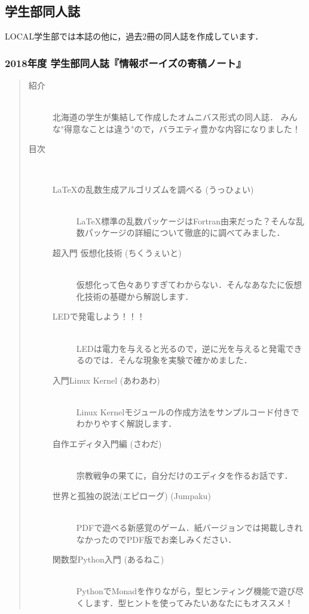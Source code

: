 \subsection{学生部同人誌}
LOCAL学生部では本誌の他に，過去2冊の同人誌を作成しています．

\subsubsection{2018年度 学生部同人誌『情報ボーイズの寄稿ノート』}
\begin{quote}
\begin{description}
\item[紹介]\mbox{}\\ 
北海道の学生が集結して作成したオムニバス形式の同人誌．
みんな"得意なことは違う"ので，バラエティ豊かな内容になりました！
\item[目次]\mbox{}\\ 
\begin{description}
\item[\LaTeX の乱数生成アルゴリズムを調べる (うっひょい)]\mbox{}\\ 
\LaTeX 標準の乱数パッケージはFortran由来だった？そんな乱数パッケージの詳細について徹底的に調べてみました．
\item[超入門 仮想化技術 (ちくうぇいと)]\mbox{}\\ 
仮想化って色々ありすぎてわからない．そんなあなたに仮想化技術の基礎から解説します．
\item[LEDで発電しよう！！！]\mbox{}\\ 
LEDは電力を与えると光るので，逆に光を与えると発電できるのでは．そんな現象を実験で確かめました．
\item[入門Linux Kernel (あわあわ)]\mbox{}\\ 
Linux Kernelモジュールの作成方法をサンプルコード付きでわかりやすく解説します．
\item[自作エディタ入門編 (さわだ)]\mbox{}\\ 
宗教戦争の果てに，自分だけのエディタを作るお話です．
\item[世界と孤独の説法(エピローグ) (Jumpaku)]\mbox{}\\ 
PDFで遊べる新感覚のゲーム．紙バージョンでは掲載しきれなかったのでPDF版でお楽しみください．
\item[関数型Python入門 (あるねこ)]\mbox{}\\ 
PythonでMonadを作りながら，型ヒンティング機能で遊び尽くします．型ヒントを使ってみたいあなたにもオススメ！
\end{description}
\end{description}
\end{quote}


